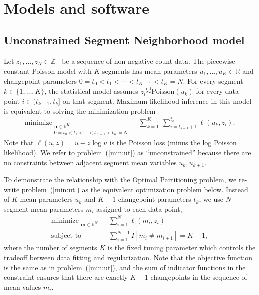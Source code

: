 \documentclass[article]{jss}
\DeclareMathOperator*{\minimize}{minimize}
\newcommand{\ZZ}{\mathbb Z}
\newcommand{\RR}{\mathbb R}
\begin{document}
\section{Models and software} \label{sec:models}

\subsection{Unconstrained Segment Neighborhood model}

Let $z_1,\dots,z_N\in\ZZ_+$ be a sequence of non-negative count
data. The piecewise constant Poisson model with $K$ segments has mean
parameters $u_1,\dots,u_K\in\RR$ and changepoint parameters
$0=t_0<t_1<\cdots<t_{K-1}<t_K=N$. For every segment
$k\in\{1,\dots,K\}$, the statistical model assumes
$z_i \stackrel{\text{iid}}{\sim} \text{Poisson}(u_k)$ for every data
point $i\in(t_{k-1},t_k]$ on that segment. Maximum likelihood
inference in this model is equivalent to solving the minimization
problem
\begin{align}
    \minimize_{\substack{
  \mathbf u\in\RR^{K}
\\
   0=t_0<t_1<\cdots<t_{K-1}<t_K=N
  }} &\ \ 
    \sum_{k=1}^K\  \sum_{i=t_{k-1}+1}^{t_k} \ell(u_k,z_i).
\label{min:ut}
\end{align}
Note that $\ell(u, z)=u-z\log u$ is the Poisson loss (minus the log
Poisson likelihood). We refer to problem~(\ref{min:ut}) as
``unconstrained'' because there are no constraints between adjacent
segment mean variables $u_k,u_{k+1}$.

To demonstrate the relationship with the Optimal Partitioning problem,
we re-write problem~(\ref{min:ut}) as the equivalent optimization
problem below. Instead of $K$ mean parameters $u_k$ and $K-1$
changepoint parameters $t_k$, we use $N$ segment mean
parameters $m_i$ assigned to each data point,
\begin{align}
    \minimize_{\substack{
  \mathbf m\in\RR^{N}
  }} &\ \ 
    \sum_{i=1}^N \ell(m_i, z_i)
\label{min:m}
\\
      \text{subject to} &\ \ \sum_{i=1}^{N-1} I[m_i\neq m_{i+1}]=K-1,
  \nonumber
\end{align}
where the number of segments $K$ is the fixed tuning parameter which
controls the tradeoff between data fitting and regularization. Note
that the objective function is the same as in problem~(\ref{min:ut}),
and the sum of indicator functions in the constraint ensures that
there are exactly $K-1$ changepoints in the sequence of mean values
$m_i$.
\end{document}

